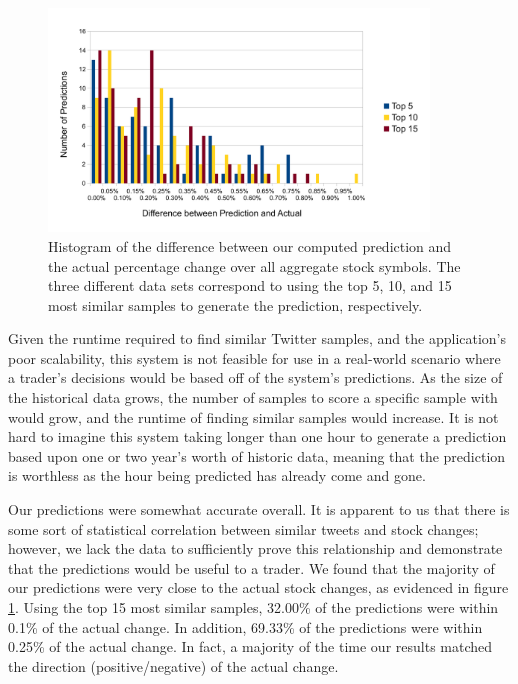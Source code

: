 \documentclass[twocolumn]{article}
\begin{document}
\begin{figure}
\centering
\includegraphics[width=0.9\textwidth]{histogram}
\caption{Histogram of the difference between our computed prediction and the actual percentage change over all aggregate stock symbols. The three different data sets correspond to using the top 5, 10, and 15 most similar samples to generate the prediction, respectively.}
\label{histogram}
\end{figure}

Given the runtime required to find similar Twitter samples, and the application's poor scalability, this system is not feasible for use in a real-world scenario where a trader's decisions would be based off of the system's predictions. As the size of the historical data grows, the number of samples to score a specific sample with would grow, and the runtime of finding similar samples would increase. It is not hard to imagine this system taking longer than one hour to generate a prediction based upon one or two year's worth of historic data, meaning that the prediction is worthless as the hour being predicted has already come and gone.

Our predictions were somewhat accurate overall. It is apparent to us that there is some sort of statistical correlation between similar tweets and stock changes; however, we lack the data to sufficiently prove this relationship and demonstrate that the predictions would be useful to a trader. We found that the majority of our predictions were very close to the actual stock changes, as evidenced in figure \ref{histogram}. Using the top 15 most similar samples, 32.00\% of the predictions were within 0.1\% of the actual change. In addition, 69.33\% of the predictions were within 0.25\% of the actual change. In fact, a majority of the time our results matched the direction (positive/negative) of the actual change. 
\end{document}
